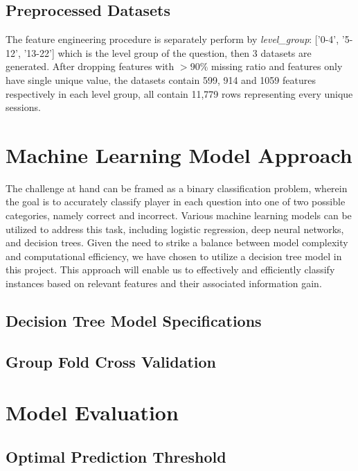 \documentclass[11pt,a4paper]{article}
\begin{document}
    \subsection{Preprocessed Datasets}
    The feature engineering procedure is separately perform by \textit{level\_group}: ['0-4', '5-12', '13-22'] which is the level group of the question, then 3 datasets are generated. After dropping features with $> 90\%$ missing ratio and features only have single unique value, the datasets contain 599, 914 and 1059 features respectively in each level group, all contain 11,779 rows representing every unique sessions.

    \section{Machine Learning Model Approach}
    The challenge at hand can be framed as a binary classification problem, wherein the goal is to accurately classify player in each question into one of two possible categories, namely correct and incorrect. Various machine learning models can be utilized to address this task, including logistic regression, deep neural networks, and decision trees. Given the need to strike a balance between model complexity and computational efficiency, we have chosen to utilize a decision tree model in this project. This approach will enable us to effectively and efficiently classify instances based on relevant features and their associated information gain.

    \subsection{Decision Tree Model Specifications}
    
    \subsection{Group Fold Cross Validation}

    \section{Model Evaluation}

    \subsection{Optimal Prediction Threshold}

    \newpage
\end{document}
